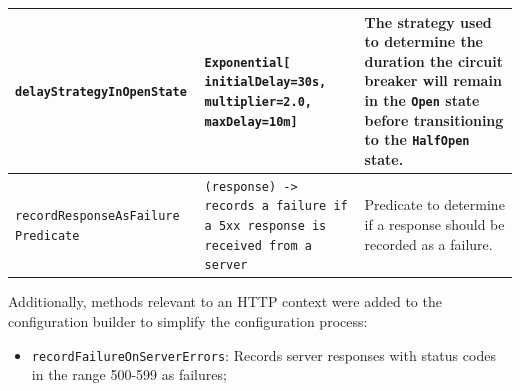 \begin{table}[!htb]
\begin{tabular}{|p{5cm}|p{5cm}|p{6cm}|}
        \texttt{delayStrategyInOpenState}          & \texttt{Exponential[ initialDelay=30s, multiplier=2.0, maxDelay=10m]}     & The strategy used to determine the duration the circuit breaker will remain in the \texttt{Open} state before transitioning to the \texttt{HalfOpen} state. \\ \hline
        \texttt{recordResponseAsFailure Predicate} & \texttt{(response) -> records a failure if a 5xx response is received from a server}                               & Predicate to determine if a response should be recorded as a failure.                                   \\ \hline
    \end{tabular}
\end{table}

Additionally, methods relevant to an HTTP context were added to the configuration builder to simplify the configuration process:

\begin{itemize}
    \item \texttt{recordFailureOnServerErrors}: Records server responses with status codes in the range 500-599 as failures;
\end{itemize}
